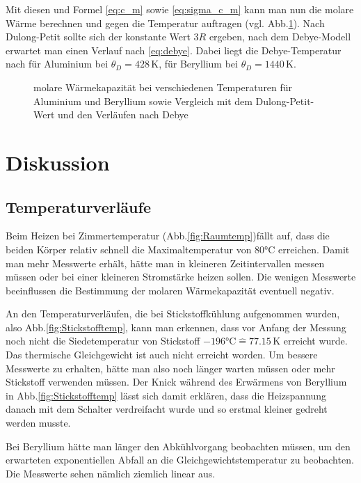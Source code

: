 \documentclass[12pt,a4paper,titlepage,headinclude,bibtotoc]{scrartcl}
\newcommand{\corresponds}{\ensuremath{\mathrel{\widehat{=}}}}
\begin{document}
Mit diesen und Formel \eqref{eq:c_m} sowie \eqref{eq:sigma_c_m} kann man nun die molare Wärme berechnen und gegen die Temperatur auftragen (vgl. Abb.\ref{fig:molWaerme}).
Nach Dulong-Petit sollte sich der konstante Wert $3R$ ergeben, nach dem Debye-Modell erwartet man einen Verlauf nach \eqref{eq:debye}.
Dabei liegt die Debye-Temperatur nach \cite[S.226]{prakti} für Aluminium bei $\theta_D=428\,\si\kelvin$, für Beryllium bei $\theta_D=1440\,\si\kelvin$.

\begin{figure}[!htb]
	\centering
	
	\caption{molare Wärmekapazität bei verschiedenen Temperaturen für Aluminium und Beryllium sowie Vergleich mit dem Dulong-Petit-Wert und den Verläufen nach Debye}
	\label{fig:molWaerme}
\end{figure}

\section{Diskussion}
\label{sec:diskussion}
\subsection{Temperaturverläufe}
Beim Heizen bei Zimmertemperatur (Abb.\ref{fig:Raumtemp})fällt auf, dass die beiden Körper relativ schnell die Maximaltemperatur von $80\si\celsius$ erreichen.
Damit man mehr Messwerte erhält, hätte man in kleineren Zeitintervallen messen müssen oder bei einer kleineren Stromstärke heizen sollen.
Die wenigen Messwerte beeinflussen die Bestimmung der molaren Wärmekapazität eventuell negativ.

An den Temperaturverläufen, die bei Stickstoffkühlung aufgenommen wurden, also Abb.\ref{fig:Stickstofftemp}, kann man erkennen, dass vor Anfang der Messung noch nicht die Siedetemperatur von Stickstoff $-196\si\celsius\corresponds 77.15\,\si\kelvin$ erreicht wurde.
Das thermische Gleichgewicht ist auch nicht erreicht worden.
Um bessere Messwerte zu erhalten, hätte man also noch länger warten müssen oder mehr Stickstoff verwenden müssen.
Der Knick während des Erwärmens von Beryllium in Abb.\ref{fig:Stickstofftemp} lässt sich damit erklären, dass die Heizspannung danach mit dem Schalter verdreifacht wurde und so erstmal kleiner gedreht werden musste.

Bei Beryllium hätte man länger den Abkühlvorgang beobachten müssen, um den erwarteten exponentiellen Abfall an die Gleichgewichtstemperatur zu beobachten.
Die Messwerte sehen nämlich ziemlich linear aus.
\end{document}
